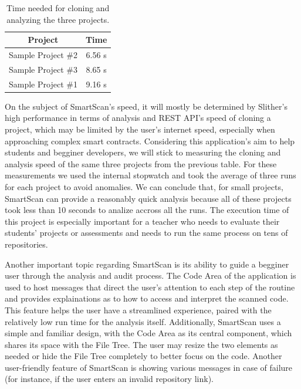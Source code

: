 \begin{table}[h]
\centering
\begin{tabular}{|c|c|}
\hline
Project            & Time   \\ \hline
Sample Project \#2 \cite{sampleProject2} & 6.56 s \\
Sample Project \#3 \cite{sampleProject3} & 8.65 s \\
Sample Project \#1 \cite{sampleProject1} & 9.16 s \\ \hline
\end{tabular}
\caption{Time needed for cloning and analyzing the three projects.}
\label{tab:my-table}
\end{table}

On the subject of SmartScan's speed, it will mostly be determined by Slither's high performance in terms of analysis and REST API's speed of cloning a project, which may be limited by the user's internet speed, especially when approaching complex smart contracts. Considering this application's aim to help students and begginer developers, we will stick to measuring the cloning and analysis speed of the same three projects from the previous table. For these measurements we used the internal stopwatch and took the average of three runs for each project to avoid anomalies. We can conclude that, for small projects, SmartScan can provide a reasonably quick analysis because all of these projects took less than 10 seconds to analize accross all the runs. The execution time of this project is especially important for a teacher who needs to evaluate their students' projects or assessments and needs to run the same process on tens of repositories.

Another important topic regarding SmartScan is its ability to guide a begginer user through the analysis and audit process. The Code Area of the application is used to host messages that direct the user's attention to each step of the routine and provides explainations as to how to access and interpret the scanned code. This feature helps the user have a streamlined experience, paired with the relatively low run time for the analysis itself. Additionally, SmartScan uses a simple and familiar design, with the Code Area as its central component, which shares its space with the File Tree. The user may resize the two elements as needed or hide the File Tree completely to better focus on the code. Another user-friendly feature of SmartScan is showing various messages in case of failure (for instance, if the user enters an invalid repository link).

